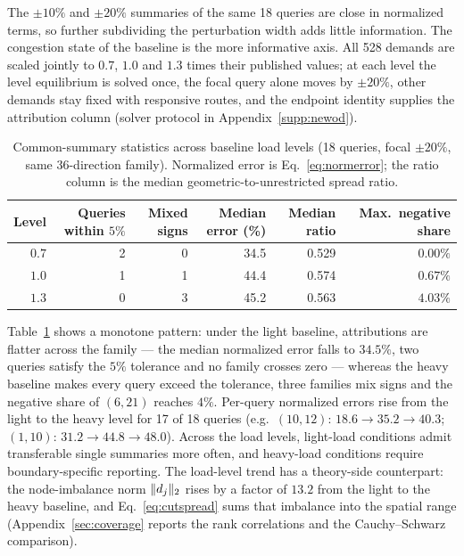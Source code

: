 The $\pm10\%$ and $\pm20\%$ summaries of the same 18 queries are close in normalized terms, so further subdividing the perturbation width adds little information. The congestion state of the baseline is the more informative axis. All 528 demands are scaled jointly to $0.7$, $1.0$ and $1.3$ times their published values; at each level the level equilibrium is solved once, the focal query alone moves by $\pm20\%$, other demands stay fixed with responsive routes, and the endpoint identity supplies the attribution column (solver protocol in Appendix~\ref{supp:newod}).
\begin{table}[t]\centering\footnotesize
\caption{Common-summary statistics across baseline load levels (18
queries, focal $\pm20\%$, same 36-direction family). Normalized error
is Eq.~\eqref{eq:normerror}; the ratio column is the median
geometric-to-unrestricted spread ratio.}\label{tab:loadlevels}
\begin{tabular}{rrrrrr}\toprule
Level & Queries within $5\%$ & Mixed signs & Median error (\%) & Median ratio & Max.\ negative share\\\midrule
$0.7$ & 2 & 0 & 34.5 & 0.529 & $0.00\%$\\
$1.0$ & 1 & 1 & 44.4 & 0.574 & $0.67\%$\\
$1.3$ & 0 & 3 & 45.2 & 0.563 & $4.03\%$\\
\bottomrule\end{tabular}\end{table}
Table~\ref{tab:loadlevels} shows a monotone pattern: under the light
baseline, attributions are flatter across the family --- the median
normalized error falls to $34.5\%$, two queries satisfy the $5\%$
tolerance and no family crosses zero --- whereas the heavy baseline
makes every query exceed the tolerance, three families mix signs and
the negative share of $(6,21)$ reaches $4\%$. Per-query normalized
errors rise from the light to the heavy level for 17 of 18 queries
(e.g.\ $(10,12)$: $18.6\to35.2\to40.3$; $(1,10)$: $31.2\to44.8\to48.0$).
Across the load levels, light-load conditions admit transferable single
summaries more often, and heavy-load conditions require
boundary-specific reporting. The load-level trend has a theory-side
counterpart: the node-imbalance norm $\lVert d_j \rVert_2$ rises by a factor
of $13.2$ from the light to the heavy baseline, and Eq.~\eqref{eq:cutspread}
sums that imbalance into the spatial range
(Appendix~\ref{sec:coverage} reports the rank correlations and the
Cauchy--Schwarz comparison).

